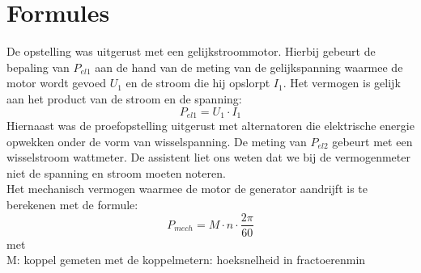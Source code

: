 \section{Formules}
De opstelling was uitgerust met een gelijkstroommotor. Hierbij gebeurt de bepaling van $P_{el1}$
aan de hand van de meting van de gelijkspanning waarmee de motor wordt gevoed $U_1$ en de stroom 
die hij opslorpt $I_1$. Het vermogen is gelijk aan het product van de stroom en de spanning:
\begin{equation}
    P_{el1} = U_1 \cdot I_1
\end{equation}
Hiernaast was de proefopstelling uitgerust met alternatoren die 
elektrische energie opwekken onder de vorm van wisselspanning. De meting van $P_{el2}$
gebeurt met een wisselstroom wattmeter. De assistent liet ons weten dat we bij de vermogenmeter
niet de spanning en stroom moeten noteren.\\

\noindent Het mechanisch vermogen waarmee de motor de generator aandrijft is te berekenen
met de formule: 
\begin{equation}
    P_{mech} = M \cdot n \cdot \frac{2\pi}{60}
\end{equation} 
met \\
M: koppel gemeten met de koppelmetern: hoeksnelheid in frac{toeren}{min}
